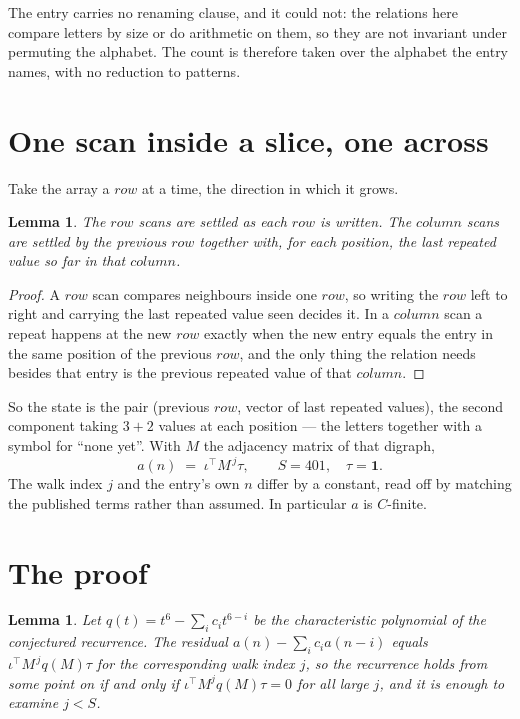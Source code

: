 \documentclass[11pt,a4paper]{article}
\theoremstyle{plain}
\newtheorem{lemma}[theorem]{Lemma}
\theoremstyle{definition}
\begin{document}
The entry carries no renaming clause, and it could not: the relations here compare letters by
size or do arithmetic on them, so they are not invariant under permuting the alphabet. The
count is therefore taken over the alphabet the entry names, with no reduction to patterns.

\section{One scan inside a slice, one across}

Take the array a $row$ at a time, the direction in which it grows.

\begin{lemma}\label{lem:state}
The $row$ scans are settled as each $row$ is written. The $column$ scans are
settled by the previous $row$ together with, for each position, the last repeated value
so far in that $column$.
\end{lemma}

\begin{proof}
A $row$ scan compares neighbours inside one $row$, so writing the
$row$ left to right and carrying the last repeated value seen decides it. In a
$column$ scan a repeat happens at the new $row$ exactly when the new entry equals the
entry in the same position of the previous $row$, and the only thing the relation needs
besides that entry is the previous repeated value of that $column$.
\end{proof}

So the state is the pair (previous $row$, vector of last repeated values), the second
component taking $3+2$ values at each position --- the letters together with a symbol for
``none yet''. With $M$ the adjacency matrix of that digraph,
\[
a(n)\;=\;\iota^{\!\top}M^{\,j}\tau ,\qquad S=401,\quad\tau=\mathbf{1} .
\]
The walk index $j$ and the entry's own $n$ differ by a constant, read off by matching the
published terms rather than assumed. In particular $a$ is $C$-finite.

\section{The proof}

\begin{lemma}\label{lem:crit}
Let $q(t)=t^{6}-\sum_i c_it^{6-i}$ be the characteristic polynomial of the
conjectured recurrence. The residual $a(n)-\sum_ic_ia(n-i)$ equals
$\iota^{\!\top}M^{\,j}q(M)\tau$ for the corresponding walk index $j$, so the recurrence
holds from some point on if and only if $\iota^{\!\top}M^{j}q(M)\tau=0$ for all large $j$,
and it is enough to examine $j<S$.
\end{lemma}
\end{document}
